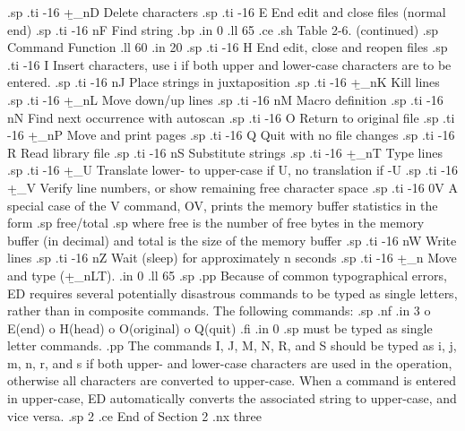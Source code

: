 $$.sp
.ti -16
  +\b_nD           Delete characters
.sp
.ti -16
  E             End edit and close files (normal end)
.sp
.ti -16
  nF            Find string
.bp
.in 0
.ll 65
.ce
.sh
Table 2-6.  (continued)
.sp
    Command                        Function     
.ll 60
.in 20
.sp
.ti -16
  H             End edit, close and reopen files
.sp
.ti -16
  I             Insert characters, use i if both upper 
and lower-case characters are to be entered.
.sp
.ti -16
  nJ            Place strings in juxtaposition
.sp
.ti -16
  +\b_nK           Kill lines
.sp
.ti -16
  +\b_nL           Move down/up lines
.sp
.ti -16
  nM            Macro definition
.sp
.ti -16
  nN            Find next occurrence with autoscan
.sp
.ti -16
  O             Return to original file
.sp
.ti -16
  +\b_nP           Move and print pages
.sp
.ti -16
  Q             Quit with no file changes
.sp
.ti -16
  R             Read library file
.sp
.ti -16
  nS            Substitute strings
.sp
.ti -16
  +\b_nT           Type lines
.sp
.ti -16
  +\b_U            Translate lower- to upper-case if U, 
no translation if -U
.sp
.ti -16
  +\b_V            Verify line numbers, or show 
remaining free character space
.sp
.ti -16
  0V            A special case of the V command, OV, 
prints the memory buffer statistics in the form
.sp
free/total
.sp
where free is the number of free bytes in the memory buffer (in 
decimal) and total is the size of the memory buffer
.sp
.ti -16
  nW            Write lines
.sp
.ti -16
  nZ            Wait (sleep) for approximately n 
seconds
.sp
.ti -16
  +\b_n            Move and type (+\b_nLT).
.in 0
.ll 65
.sp
.pp
Because of common typographical errors, ED requires several 
potentially disastrous commands to be typed as single letters, 
rather than in composite commands.  The following commands:
.sp
.nf
.in 3
o E(end) 
o H(head) 
o O(original)  
o Q(quit)
.fi
.in 0
.sp
must be typed as single letter commands.
.pp
The commands I, J, M, N, R, and S should be typed as i, j, m, n, 
r, and s if both upper- and lower-case characters are used in the 
operation, otherwise all characters are converted to upper-case.  
When a command is entered in upper-case, ED automatically 
converts the associated string to upper-case, and vice versa.
.sp 2
.ce
End of Section 2
.nx three




